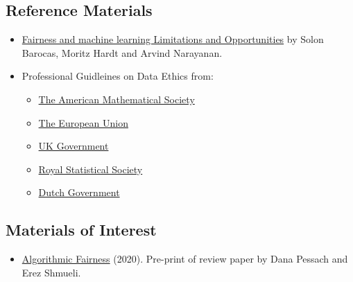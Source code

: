 \documentclass[
  12pt,
]{book}
\providecommand{\tightlist}{%
  \setlength{\itemsep}{0pt}\setlength{\parskip}{0pt}}
\begin{document}
\hypertarget{reference-materials-3}{%
\subsection*{Reference Materials}\label{reference-materials-3}}

\begin{itemize}
\item
  \href{https://fairmlbook.org/}{Fairness and machine learning
  Limitations and Opportunities} by Solon Barocas, Moritz Hardt and Arvind Narayanan.
\item
  Professional Guidleines on Data Ethics from:

  \begin{itemize}
  \tightlist
  \item
    \href{http://www.ams.org/about-us/governance/policy-statements/sec-ethics}{The American Mathematical Society}
  \item
    \href{https://op.europa.eu/s/sUPP}{The European Union}
  \item
    \href{https://www.gov.uk/guidance/understanding-artificial-intelligence-ethics-and-safety}{UK Government}
  \item
    \href{https://rss.org.uk/RSS/media/News-and-publications/Publications/Reports\%20and\%20guides/A-Guide-for-Ethical-Data-Science-Final-Oct-2019.pdf}{Royal Statistical Society}
  \item
    \href{https://www.government.nl/documents/reports/2021/07/31/impact-assessment-fundamental-rights-and-algorithms}{Dutch Government}
  \end{itemize}
\end{itemize}

\hypertarget{materials-of-interest-4}{%
\subsection*{Materials of Interest}\label{materials-of-interest-4}}

\begin{itemize}
\tightlist
\item
  \href{https://arxiv.org/abs/2001.09784}{Algorithmic Fairness} (2020). Pre-print of review paper by Dana Pessach and Erez Shmueli.
\end{itemize}

  
\end{document}
